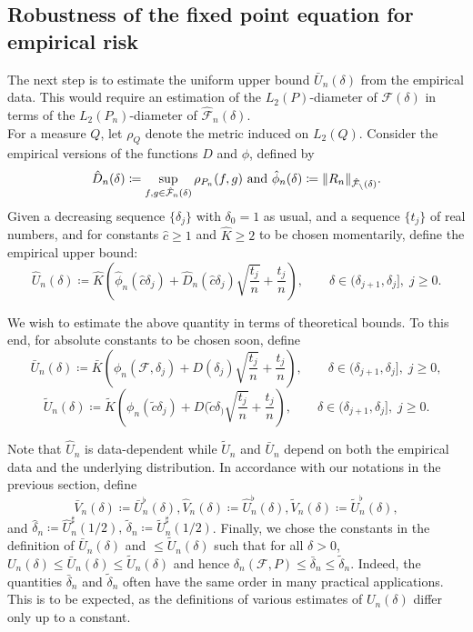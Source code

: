 \subsection{Robustness of the fixed point equation for empirical risk}

The next step is to estimate the uniform upper bound $\bar{U}_n(\delta)$ from the empirical data. This would require an estimation of the $L_2(P)$-diameter of $\mathcal{F}(\delta)$ in terms of the $L_2(P_n)$-diameter of $\hat{\mathcal{F}}_n(\delta)$.\\

For a measure $Q$, let $\rho_Q$ denote the metric induced on $L_2(Q)$. Consider the empirical versions of the functions $ D$ and $\phi$, defined by
\[\hat{D}_n (\delta) \coloneqq \sup_{f,g \in \hat{\mathcal{F}}_n(\delta)} \rho_{P_n}(f,g) \text{  and  } \hat{\phi}_n(\delta)\coloneqq \norm{R_n}_{\mathcal{\hat{\mathcal{F}}_n(\delta)}}.\]
Given a decreasing sequence $\{\delta_j\}$ with $\delta_0 = 1$ as usual, and a sequence $\{t_j\}$ of real numbers, and for constants $\hat{c} \geq 1$ and $\hat{K} \geq 2$ to be chosen momentarily, define the empirical upper bound:
\[
  \hat{U}_n(\delta)\coloneqq\hat{K}\left(\hat{\phi}_n(\hat{c}\delta_j)+\hat{D}_n(\hat{c}\delta_j)\sqrt{\frac{t_j}{n}}+\frac{t_j}{n}\right),\qquad\delta \in (\delta_{j+1}, \delta_j],\; j \geq 0.
\]


We wish to estimate the above quantity in terms of theoretical bounds. To this end, for absolute constants to be chosen soon, define
\[
  \bar{U}_n(\delta)\coloneqq \bar{K}\left(\phi_n(\mathcal{F},\delta_j)+D(\delta_j)\sqrt{\frac{t_j}{n}}+\frac{t_j}{n}\right),\qquad\delta \in (\delta_{j+1}, \delta_j],\; j \geq 0,
\]
\[
  \tilde{U}_n(\delta)\coloneqq \tilde{K}\left(\phi_n(\tilde{c}\delta_j)+D(\tilde{c}\delta_)\sqrt{\frac{t_j}{n}}+\frac{t_j}{n}\right),\qquad\delta \in (\delta_{j+1}, \delta_j],\; j \geq 0.
\]

Note that $\hat{U}_n$ is data-dependent while $\tilde{U}_n$ and $\bar{U}_n$ depend on both the empirical data and the underlying distribution. In accordance with our notations in the previous section, define
\[\bar{V}_n(\delta) \coloneqq \bar{U}^\flat_n(\delta), \hat{V}_n(\delta) \coloneqq \hat{U}^\flat_n(\delta), \tilde{V}_n(\delta) \coloneqq \tilde{U}^\flat_n(\delta),\]
and $\hat{\delta}_n \coloneqq \hat{U}^\sharp_n(1/2), \,\tilde{\delta}_n \coloneqq \tilde{U}^\sharp_n(1/2)$. Finally, we chose the constants in the definition of $\bar{U}_n(\delta)$ and $  \leq $$\tilde{U}_n(\delta)$ such that for all $\delta>0$, $U_n(\delta) \leq \bar{U}_n(\delta) \leq \tilde{U}_n(\delta)$ and hence $\delta_n(\mathcal{F},P) \leq \bar{\delta}_n \leq \tilde{\delta}_n$. Indeed, the quantities $\bar{\delta}_n$ and $\tilde{\delta}_n$ often have the same order in many practical applications. This is to be expected, as the definitions of various estimates of $U_n(\delta)$ differ only up to a constant.\\

